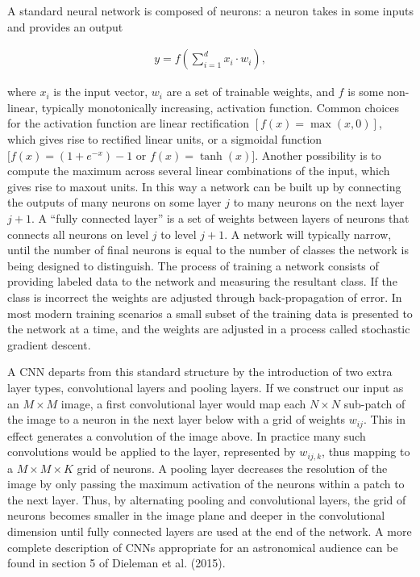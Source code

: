 \documentclass[a4paper,10pt]{article}
\begin{document}
{\noindent}A standard neural network is composed of neurons: a neuron takes in some inputs and provides an output

\begin{align*}
    y = f \left(\sum_{i=1}^dx_i\cdot w_i\right),
\end{align*}

{\noindent}where $x_i$ is the input vector, $w_i$ are a set of trainable weights, and $f$ is some non-linear, typically monotonically increasing, activation function. Common choices for the activation function are linear rectification $[f(x) = \max (x, 0)]$, which gives rise to rectified linear units, or a sigmoidal function $[f(x) = (1+e^{-x})-1$ or $f(x) = \tanh(x)]$. Another possibility is to compute the maximum across several linear combinations of the input, which gives rise to maxout units. In this way a network can be built up by connecting the outputs of many neurons on some layer $j$ to many neurons on the next layer $j+1$. A ``fully connected layer'' is a set of weights between layers of neurons that connects all neurons on level $j$ to level $j+1$. A network will typically narrow, until the number of final neurons is equal to the number of classes the network is being designed to distinguish. The process of training a network consists of providing labeled data to the network and measuring the resultant class. If the class is incorrect the weights are adjusted through back-propagation of error. In most modern training scenarios a small subset of the training data is presented to the network at a time, and the weights are adjusted in a process called stochastic gradient descent.

{\noindent}A CNN departs from this standard structure by the introduction of two extra layer types, convolutional layers and pooling layers. If we construct our input as an $M\times M$ image, a first convolutional layer would map each $N\times N$ sub-patch of the image to a neuron in the next layer below with a grid of weights $w_{ij}$. This in effect generates a convolution of the image above. In practice many such convolutions would be applied to the layer, represented by $w_{ij,k}$, thus mapping to a $M\times M\times K$ grid of neurons. A pooling layer decreases the resolution of the image by only passing the maximum activation of the neurons within a patch to the next layer. Thus, by alternating pooling and convolutional layers, the grid of neurons becomes smaller in the image plane and deeper in the convolutional dimension until fully connected layers are used at the end of the network. A more complete description of CNNs appropriate for an astronomical audience can be found in section 5 of Dieleman et al. (2015).
\end{document}
